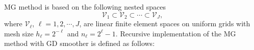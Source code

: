 \begin{enumerate}
%
%
%
%
%
%
%


MG method is based on the following nested spaces
\begin{equation*}
\mathcal V_1 \subset \mathcal V_2 \subset \cdots \subset \mathcal V_J,
\end{equation*}
where $\mathcal V_\ell$, $\ell = 1, 2, \cdots, J$, are linear finite element spaces on uniform grids with mesh size $h_\ell = 2^{-\ell}$ and $n_\ell = 2^\ell-1$. 
Recursive implementation of the MG method with GD smoother is defined as follows:


\end{enumerate}
